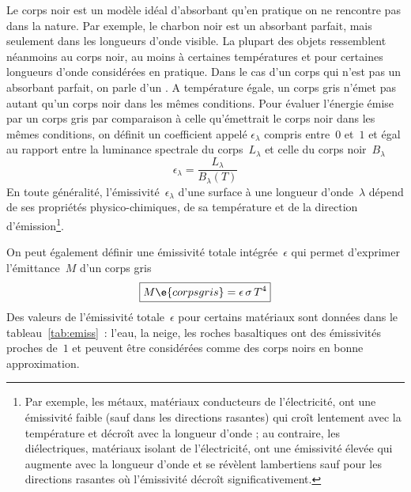 \sk
Le corps noir est un modèle idéal d'absorbant qu'en pratique on ne rencontre pas dans la nature. Par exemple, le charbon noir est un absorbant parfait, mais seulement dans les longueurs d'onde visible. La plupart des objets ressemblent néanmoins au corps noir, au moins à certaines températures et pour certaines longueurs d'onde considérées en pratique. Dans le cas d'un corps qui n'est pas un absorbant parfait, on parle d'un . A température égale, un corps gris n'émet pas autant qu'un corps noir dans les mêmes conditions. Pour évaluer l'énergie émise par un corps gris par comparaison à celle qu'émettrait le corps noir dans les mêmes conditions, on définit un coefficient appelé  $\epsilon_\lambda$ compris entre~$0$ et~$1$ et égal au rapport entre la luminance spectrale du corps~$L_\lambda$ et celle du corps noir~$B_\lambda$ $$ \epsilon_\lambda=\frac{L_\lambda}{B_\lambda(T)} $$ En toute généralité, l'émissivité~$\epsilon_{\lambda}$ d'une surface à une longueur d'onde~$\lambda$ dépend de ses propriétés physico-chimiques, de sa température et de la direction d'émission\footnote{Par exemple, les métaux, matériaux conducteurs de l'électricité, ont une émissivité faible (sauf dans les directions rasantes) qui croît lentement avec la température et décroît avec la longueur d'onde ; au contraire, les diélectriques, matériaux isolant de l'électricité, ont une émissivité élevée qui augmente avec la longueur d'onde et se révèlent lambertiens sauf pour les directions rasantes où l'émissivité décroît significativement.}.

\sk
On peut également définir une émissivité totale intégrée~$\epsilon$ qui permet d'exprimer l'émittance~$M$ d'un corps gris $$ \boxed{ M\e{corps gris} = \epsilon \, \sigma \, T^4 } $$ Des valeurs de l'émissivité totale~$\epsilon$ pour certains matériaux sont données dans le tableau~\ref{tab:emiss}~: l'eau, la neige, les roches basaltiques ont des émissivités proches de~$1$ et peuvent être considérées comme des corps noirs en bonne approximation. 

